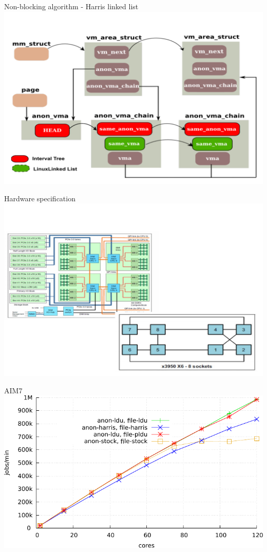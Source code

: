 \documentclass[english]{beamer} %
\begin{document}
\begin{frame}{Non-blocking algorithm - Harris linked list}
\includegraphics[scale=0.5]{fig/lockfree}
\end{frame}

\begin{frame}{Hardware specification}
\includegraphics[scale=0.5]{fig/hardware}
\end{frame}


\begin{frame}{AIM7}
\includegraphics[scale=0.8]{graph/aim7}
\end{frame}
\end{document}
